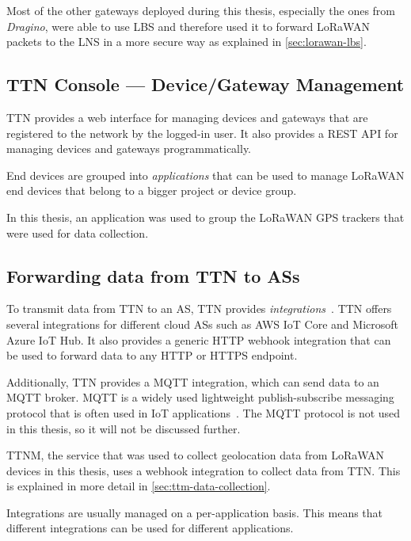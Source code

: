Most of the other gateways deployed during this thesis, especially the ones from \emph{Dragino}, were able to use \ac{LBS} and therefore used it to forward \ac{LoRaWAN} packets to the \ac{LNS} in a more secure way as explained in \cref{sec:lorawan-lbs}.

\subsection{\acs{TTN} Console --- Device/Gateway Management}\label{sec:web-interface-and-device-gateway-management}

\ac{TTN} provides a web interface for managing devices and gateways that are registered to the network by the logged-in user.
It also provides a \ac{REST} \ac{API} for managing devices and gateways programmatically.

End devices are grouped into \emph{applications} that can be used to manage \ac{LoRaWAN} end devices that belong to a bigger project or device group.

In this thesis, an application was used to group the \ac{LoRaWAN} \ac{GPS} trackers that were used for data collection.

\subsection{Forwarding data from \acs{TTN} to \aclp{AS}}\label{sec:forwarding-data-from-ttn-to-as}

To transmit data from \ac{TTN} to an \ac{AS}, \ac{TTN} provides \emph{integrations}~\cite{the_things_network_integrations_2021}.
\ac{TTN} offers several integrations for different cloud \acp{AS} such as \ac{AWS} IoT Core and Microsoft Azure IoT Hub.
It also provides a generic \ac{HTTP} webhook integration that can be used to forward data to any \ac{HTTP} or \ac{HTTPS} endpoint.

Additionally, \ac{TTN} provides a MQTT integration, which can send data to an MQTT broker.
MQTT is a widely used lightweight publish-subscribe messaging protocol that is often used in \ac{IoT} applications~\cite{mqtt_mqtt_2022}.
The MQTT protocol is not used in this thesis, so it will not be discussed further.

\ac{TTNM}, the service that was used to collect geolocation data from \ac{LoRaWAN} devices in this thesis, uses a webhook integration to collect data from \ac{TTN}.
This is explained in more detail in \cref{sec:ttm-data-collection}.

Integrations are usually managed on a per-application basis.
This means that different integrations can be used for different applications.

